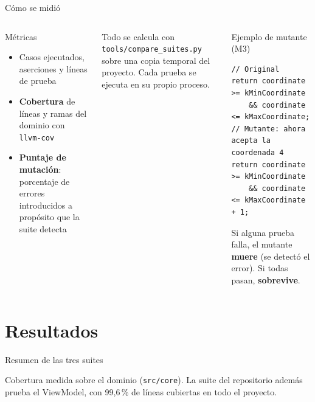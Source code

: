 \documentclass[aspectratio=169,10pt]{beamer}
\begin{document}
\begin{frame}[fragile]{Cómo se midió}
  \begin{columns}[T,onlytextwidth]
    \begin{block}{Métricas}
      \small
      \begin{itemize}
        \item Casos ejecutados, aserciones y líneas de prueba
        \item \textbf{Cobertura} de líneas y ramas del dominio con \texttt{llvm-cov}
        \item \textbf{Puntaje de mutación}: porcentaje de errores introducidos a propósito que la suite detecta
      \end{itemize}
    \end{block}
    \small
    Todo se calcula con \texttt{tools/compare\_suites.py} sobre una copia temporal del
    proyecto. Cada prueba se ejecuta en su propio proceso.
    \begin{block}{Ejemplo de mutante (M3)}
\begin{lstlisting}
// Original
return coordinate >= kMinCoordinate
    && coordinate <= kMaxCoordinate;
// Mutante: ahora acepta la coordenada 4
return coordinate >= kMinCoordinate
    && coordinate <= kMaxCoordinate + 1;
\end{lstlisting}
      \small
      Si alguna prueba falla, el mutante \textcolor{ok}{\textbf{muere}} (se detectó el error).
      Si todas pasan, \textcolor{mal}{\textbf{sobrevive}}.
    \end{block}
  \end{columns}
\end{frame}

\section{Resultados}

\begin{frame}{Resumen de las tres suites}
  \centering
  \footnotesize
  \renewcommand{\arraystretch}{1.15}
  
  \vfill
  \raggedright
  \footnotesize Cobertura medida sobre el dominio (\texttt{src/core}). La suite del repositorio
  además prueba el ViewModel, con 99,6\,\% de líneas cubiertas en todo el proyecto.
\end{frame}
\end{document}

